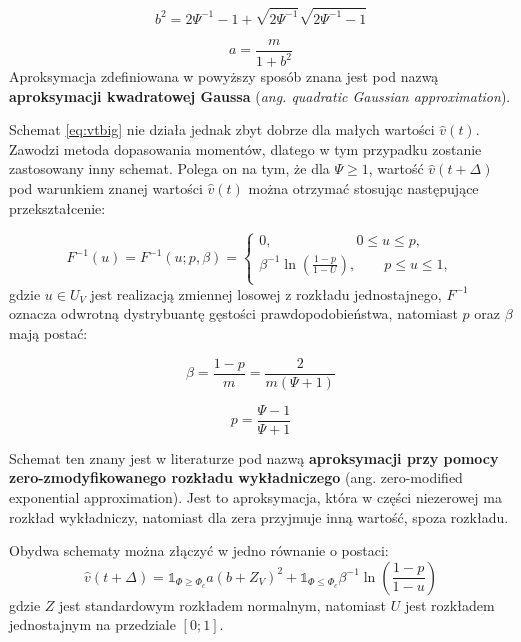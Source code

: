 \documentclass{pracamgr}
\begin{document}
\begin{equation}
\label{eq:b}
b^2 = 2 \Psi^{-1} - 1 + \sqrt{2 \Psi^{-1}} \sqrt{2 \Psi^{-1} - 1}
\end{equation}

\begin{equation}
\label{eq:a}
a = \frac{m}{1 + b^2}
\end{equation}
Aproksymacja zdefiniowana w powyższy sposób znana jest pod nazwą 
\textbf{aproksymacji kwadratowej Gaussa} (\textit{ang. quadratic Gaussian approximation}).


Schemat \ref{eq:vtbig} nie działa jednak zbyt dobrze dla małych wartości $\hat{v}(t)$. Zawodzi metoda 
dopasowania momentów, dlatego w tym przypadku 
zostanie zastosowany inny schemat. Polega on na tym, że dla $\Psi \geq 1$, wartość 
$\hat{v}(t + \Delta)$ pod warunkiem znanej wartości $\hat{v}(t)$ można otrzymać 
stosując następujące przekształcenie:

\begin{equation}
\label{eq:psi}
F^{-1}(u) = F^{-1}(u;p,\beta) = \begin{cases}
               0, \qquad \qquad \qquad  0 \le u \leq p,\\
               \beta^{-1} \ln (\frac{1-p}{1-U}), \qquad  p \le u \leq 1, \\
            \end{cases} 
\end{equation} 
gdzie $u \in U_V$ jest realizacją zmiennej losowej z rozkładu jednostajnego, $F^{-1}$ oznacza
odwrotną dystrybuantę gęstości prawdopodobieństwa, natomiast $p$ oraz $\beta$ mają postać:

\begin{equation}
\label{eq:beta}
\beta = \frac{1-p}{m} = \frac{2}{m(\Psi + 1)}
\end{equation}

\begin{equation}
\label{eq:p}
p = \frac{\Psi - 1}{\Psi + 1}
\end{equation}

Schemat ten znany jest w literaturze pod nazwą \textbf{aproksymacji przy pomocy zero-zmodyfikowanego rozkładu
wykładniczego} (ang. zero-modified exponential approximation). 
Jest to aproksymacja, która w części niezerowej ma 
rozkład wykładniczy, natomiast dla zera przyjmuje inną wartość, spoza rozkładu. 


Obydwa schematy można złączyć w jedno równanie o postaci:
\begin{equation}
\label{eq:andersen}
\hat{v}(t + \Delta)  = \mathds{1}_{\Phi \geq \Phi_c} a (b + Z_V)^2
 + \mathds{1}_{\Phi \le \Phi_c} \beta^{-1} \ln (\frac{1-p}{1-u})
\end{equation}
gdzie $Z$ jest standardowym rozkładem normalnym, natomiast $U$ jest rozkładem jednostajnym na 
przedziale $[0;1]$.
\end{document}
